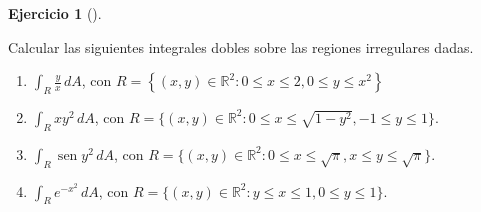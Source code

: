 \documentclass[
  a4paper,
]{scrreport}
\theoremstyle{definition}
\newtheorem{exercise}{Ejercicio}[chapter]
\theoremstyle{remark}
\begin{document}
\begin{exercise}[]\protect\hypertarget{exr-integrales-dobles-regiones-irregulares}{}\label{exr-integrales-dobles-regiones-irregulares}

Calcular las siguientes integrales dobles sobre las regiones irregulares
dadas.

\begin{enumerate}
\def\labelenumi{\alph{enumi}.}
\item
  \(\int_R \frac{y}{x}\,dA\), con
  \(R=\left\{(x,y)\in\mathbb{R}^2: 0\leq x\leq 2, 0\leq y\leq x^2\right\}\)
\item
  \(\int_R xy^2\,dA\), con
  \(R=\{(x,y)\in\mathbb{R}^2: 0\leq x\leq \sqrt{1-y^2}, -1\leq y\leq 1\}\).
\item
  \(\int_R \operatorname {sen}{y^2}\,dA\), con
  \(R=\{(x,y)\in\mathbb{R}^2: 0\leq x\leq \sqrt{\pi}, x\leq y\leq \sqrt{\pi}\}\).
\item
  \(\int_R e^{-x^2}\,dA\), con
  \(R=\{(x,y)\in\mathbb{R}^2: y\leq x\leq 1, 0\leq y\leq 1\}\).
\end{enumerate}

\end{exercise}
\end{document}
